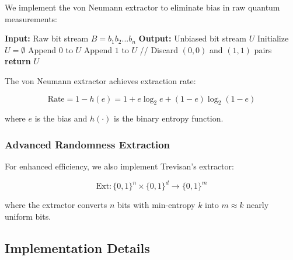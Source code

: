 \documentclass[11pt,a4paper]{article}
\begin{document}
We implement the von Neumann extractor to eliminate bias in raw quantum measurements:

\begin{algorithm}[H]
\caption{Von Neumann Entropy Extraction}
\begin{algorithmic}
\STATE \textbf{Input:} Raw bit stream $B = b_1b_2...b_n$
\STATE \textbf{Output:} Unbiased bit stream $U$
\STATE Initialize $U = \emptyset$
        \STATE Append $0$ to $U$
        \STATE Append $1$ to $U$
    \ENDIF
    \STATE // Discard $(0,0)$ and $(1,1)$ pairs
\ENDFOR
\STATE \textbf{return} $U$
\end{algorithmic}
\end{algorithm}

The von Neumann extractor achieves extraction rate:

\begin{equation}
\text{Rate} = 1 - h(e) = 1 + e\log_2 e + (1-e)\log_2(1-e)
\end{equation}

where $e$ is the bias and $h(\cdot)$ is the binary entropy function.

\subsubsection{Advanced Randomness Extraction}

For enhanced efficiency, we also implement Trevisan's extractor:

\begin{equation}
\text{Ext}: \{0,1\}^n \times \{0,1\}^d \rightarrow \{0,1\}^m
\end{equation}

where the extractor converts $n$ bits with min-entropy $k$ into $m \approx k$ nearly uniform bits.

\subsection{Implementation Details}
\end{document}
